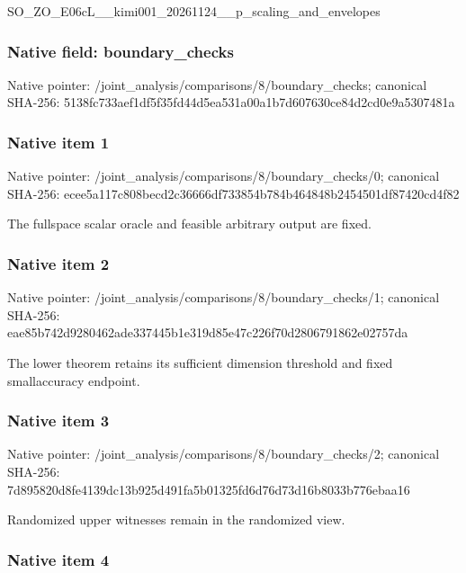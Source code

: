 \documentclass[10pt,a4paper]{article}
\begin{document}
SO\_ZO\_E06cL\_\_kimi001\_202\allowbreak{}61124\_\_p\_scaling\_and\_env\allowbreak{}elopes


\subsubsection{Native field: boundary\_checks}


Native pointer: /joint\_analysis/comparis\allowbreak{}ons/8/boundary\_checks; canonical SHA-256: 5138fc733aef1df5f35fd44d\allowbreak{}5ea531a00a1b7d607630ce84\allowbreak{}d2cd0e9a5307481a



\subsubsection{Native item 1}


Native pointer: /joint\_analysis/comparis\allowbreak{}ons/8/boundary\_checks/0; canonical SHA-256: ecee5a117c808becd2c36666\allowbreak{}df733854b784b464848b2454\allowbreak{}501df87420cd4f82


The fullspace scalar oracle and feasible arbitrary output are fixed.


\subsubsection{Native item 2}


Native pointer: /joint\_analysis/comparis\allowbreak{}ons/8/boundary\_checks/1; canonical SHA-256: eae85b742d9280462ade3374\allowbreak{}45b1e319d85e47c226f70d28\allowbreak{}06791862e02757da


The lower theorem retains its sufficient dimension threshold and fixed smallaccuracy endpoint.


\subsubsection{Native item 3}


Native pointer: /joint\_analysis/comparis\allowbreak{}ons/8/boundary\_checks/2; canonical SHA-256: 7d895820d8fe4139dc13b925\allowbreak{}d491fa5b01325fd6d76d73d1\allowbreak{}6b8033b776ebaa16


Randomized upper witnesses remain in the randomized view.


\subsubsection{Native item 4}
\end{document}
